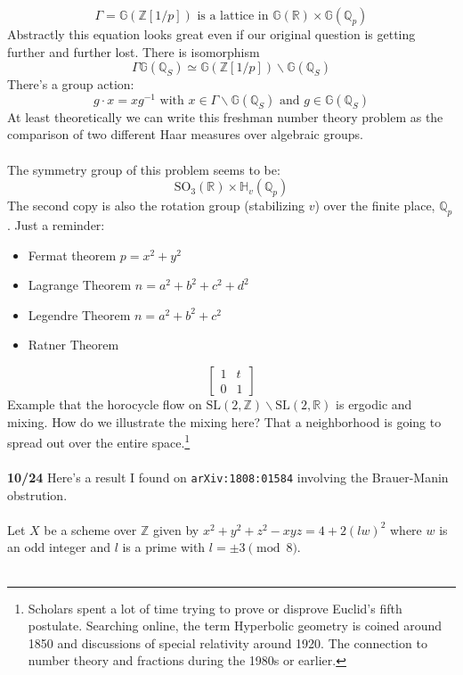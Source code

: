 \documentclass[12pt]{article}
\begin{document}
{$$ \Gamma = \mathbb{G}(\mathbb{Z}[1/p]) \text{ is a lattice in } \mathbb{G}(\mathbb{R}) \times \mathbb{G}(\mathbb{Q}_p) $$
Abstractly this equation looks great even if our original question is getting further and further lost.   There is isomorphism
$$ \Gamma \mathbb{G}(\mathbb{Q}_S) \simeq \mathbb{G}(\mathbb{Z}[1/p]) \backslash \mathbb{G}(\mathbb{Q}_S) $$
There's a group action:
$$ g \cdot x = xg^{-1} \text{ with }x \in \Gamma \backslash \mathbb{G}(\mathbb{Q}_S) \text{ and } g \in \mathbb{G}(\mathbb{Q}_S) $$
At least theoretically we can write this freshman number theory problem as the comparison of two different Haar measures over algebraic groups. \\ \\  
The symmetry group of this problem seems to be: 
$$ \text{SO}_3(\mathbb{R}) \times \mathbb{H}_v(\mathbb{Q}_p) $$
The second copy is also the rotation group (stabilizing $v$) over the finite place, $\mathbb{Q}_p$. 
\newpage
Just a reminder: 
\begin{itemize}
\item Fermat theorem $p = x^2 + y^2$
\item Lagrange Theorem $n = a^2 + b^2 + c^2 + d^2$
\item Legendre Theorem $n = a^2 + b^2 + c^2$
\item Ratner Theorem 
\end{itemize}
$$ \left[ \begin{array}{cc} 1 & t \\ 0 & 1 \end{array} \right] $$
Example that the horocycle flow on $ \text{SL}(2, \mathbb{Z}) \backslash \text{SL}(2, \mathbb{R}) $ is ergodic and mixing.  How do we illustrate the mixing here?  That a neighborhood is going to spread out over the entire space.\footnote{Scholars spent a lot of time trying to prove or disprove Euclid's fifth postulate.  Searching online, the term Hyperbolic geometry is coined around 1850 and discussions of special relativity around 1920.  The connection to number theory and fractions during the 1980s or earlier.}\\ \\
\textbf{10/24} Here's a result I found on \texttt{arXiv:1808:01584} involving the Brauer-Manin obstrution. \\ \\
Let $X$ be a scheme over $\mathbb{Z}$ given by $x^2 + y^2 + z^2 - xyz = 4 + 2(lw)^2 $ where $w$ is an odd integer and $l$ is a prime with $l = \pm 3 \pmod 8$.  \\ \\
}
\end{document}

